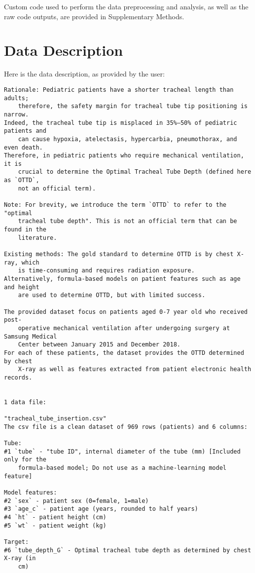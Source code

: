 \documentclass[11pt]{article}
\begin{document}
Custom code used to perform the data preprocessing and analysis, as well as the raw code outputs, are provided in Supplementary Methods.


\clearpage
\appendix

\section{Data Description} \label{sec:data_description} Here is the data description, as provided by the user:

\begin{Verbatim}[tabsize=4]
Rationale: Pediatric patients have a shorter tracheal length than adults;
	therefore, the safety margin for tracheal tube tip positioning is narrow.
Indeed, the tracheal tube tip is misplaced in 35%–50% of pediatric patients and
	can cause hypoxia, atelectasis, hypercarbia, pneumothorax, and even death.
Therefore, in pediatric patients who require mechanical ventilation, it is
	crucial to determine the Optimal Tracheal Tube Depth (defined here as `OTTD`,
	not an official term).

Note: For brevity, we introduce the term `OTTD` to refer to the "optimal
	tracheal tube depth". This is not an official term that can be found in the
	literature.

Existing methods: The gold standard to determine OTTD is by chest X-ray, which
	is time-consuming and requires radiation exposure.
Alternatively, formula-based models on patient features such as age and height
	are used to determine OTTD, but with limited success.

The provided dataset focus on patients aged 0-7 year old who received post-
	operative mechanical ventilation after undergoing surgery at Samsung Medical
	Center between January 2015 and December 2018.
For each of these patients, the dataset provides the OTTD determined by chest
	X-ray as well as features extracted from patient electronic health records.


1 data file:

"tracheal_tube_insertion.csv"
The csv file is a clean dataset of 969 rows (patients) and 6 columns:

Tube:
#1 `tube` - "tube ID", internal diameter of the tube (mm) [Included only for the
	formula-based model; Do not use as a machine-learning model feature]

Model features:
#2 `sex` - patient sex (0=female, 1=male)
#3 `age_c` - patient age (years, rounded to half years)
#4 `ht` - patient height (cm)
#5 `wt` - patient weight (kg)

Target:
#6 `tube_depth_G` - Optimal tracheal tube depth as determined by chest X-ray (in
	cm)



\end{Verbatim}
\end{document}
